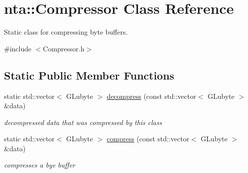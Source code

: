 \hypertarget{classnta_1_1Compressor}{}\section{nta\+:\+:Compressor Class Reference}
\label{classnta_1_1Compressor}


Static class for compressing byte buffers.  




{\ttfamily \#include $<$Compressor.\+h$>$}

\subsection*{Static Public Member Functions}
\begin{DoxyCompactItemize}
\item 
\mbox{\label{classnta_1_1Compressor_aaf2c8b87946d2cee8b4edcf4c48f7f71}} 
static std\+::vector$<$ G\+Lubyte $>$ \hyperlink{classnta_1_1Compressor_aaf2c8b87946d2cee8b4edcf4c48f7f71}{decompress} (const std\+::vector$<$ G\+Lubyte $>$ \&data)
\begin{DoxyCompactList}\small\item\em decompressed data that was compressed by this class \end{DoxyCompactList}\item 
\mbox{\label{classnta_1_1Compressor_ac5f5822b598309d4ef6a89edb7bdcf10}} 
static std\+::vector$<$ G\+Lubyte $>$ \hyperlink{classnta_1_1Compressor_ac5f5822b598309d4ef6a89edb7bdcf10}{compress} (const std\+::vector$<$ G\+Lubyte $>$ \&data)
\begin{DoxyCompactList}\small\item\em compresses a bye buffer \end{DoxyCompactList}\end{DoxyCompactItemize}
